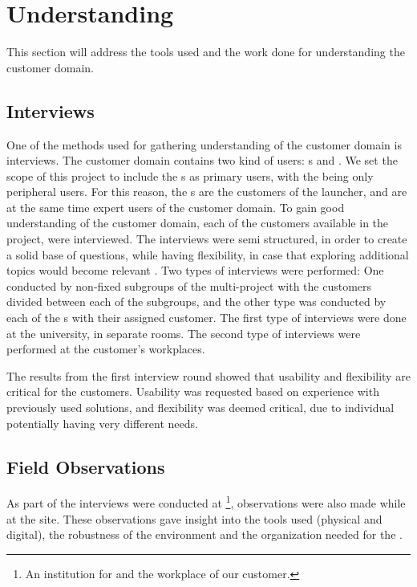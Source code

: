 \section{Understanding}
\label{understanding}
This section will address the tools used and the work done for understanding the customer domain.

\subsection{Interviews}
One of the methods used for gathering understanding of the customer domain is interviews. 
The customer domain contains two kind of users: \guardian[c]s and \autists[]. 
We set the scope of this project to include the \guardian[]s as primary users, with the \autists[] being only peripheral users. 
For this reason, the \guardian[]s are the customers of the \giraf[] launcher, and are at the same time expert users of the customer domain. 
To gain good understanding of the customer domain, each of the customers available in the project, were interviewed. 
The interviews were semi structured, in order to create a solid base of questions, while having flexibility, in case that exploring additional topics would become relevant . 
Two types of interviews were performed: One conducted by non-fixed subgroups of the multi-project with the customers divided between each of the subgroups, and the other type was conducted by each of the \localgroup{}s with their assigned customer. 
The first type of interviews were done at the university, in separate rooms. 
The second type of interviews were performed at the customer's workplaces. \newline

The results from the first interview round showed that usability and flexibility are critical for the customers. 
Usability was requested based on experience with previously used solutions, and flexibility was deemed critical, due to individual \autists[] potentially having very different needs.

\subsection{Field Observations}
As part of the interviews were conducted at \egebakken{}\footnote{An institution for \autists[] and the workplace of our customer.}, observations were also made while at the site. 
These observations gave insight into the tools used (physical and digital), the robustness of the environment and the organization needed for the \autists[]. 

